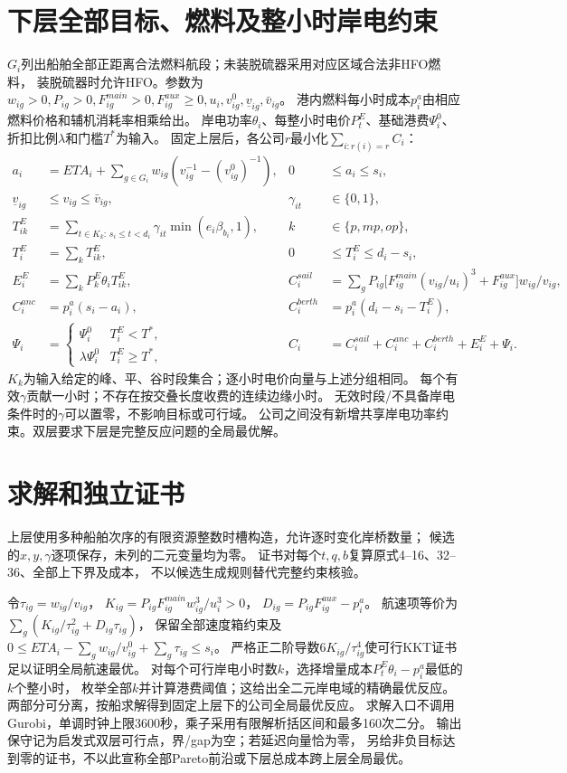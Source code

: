 \documentclass[11pt]{ctexart}
\begin{document}
\section*{下层全部目标、燃料及整小时岸电约束}
$G_i$列出船舶全部正距离合法燃料航段；未装脱硫器采用对应区域合法非HFO燃料，
装脱硫器时允许HFO。参数为$w_{ig}>0,P_{ig}>0,F^{main}_{ig}>0,
F^{aux}_{ig}\ge0,u_i,v^0_{ig},\underline v_{ig},\bar v_{ig}$。
港内燃料每小时成本$p_i^a$由相应燃料价格和辅机消耗率相乘给出。
岸电功率$\theta_i$、每整小时电价$P_t^E$、基础港费$\Psi_i^0$、
折扣比例$\lambda$和门槛$T^*$为输入。
固定上层后，各公司$r$最小化$\sum_{i:r(i)=r}C_i$：
\begin{align*}
a_i&=ETA_i+\sum_{g\in G_i}w_{ig}(v_{ig}^{-1}-(v^0_{ig})^{-1}),&
0&\le a_i\le s_i,\\
\underline v_{ig}&\le v_{ig}\le\bar v_{ig},&
\gamma_{it}&\in\{0,1\},\\
T_{ik}^E&=\sum_{t\in K_k:\,s_i\le t<d_i}
             \gamma_{it}\min(e_i\beta_{b_i},1),&
k&\in\{p,mp,op\},\\
T_i^E&=\sum_kT_{ik}^E,&
0&\le T_i^E\le d_i-s_i,\\
E_i^E&=\sum_k P_k^E\theta_i T_{ik}^E,&
C_i^{sail}&=\sum_gP_{ig}\big[F^{main}_{ig}(v_{ig}/u_i)^3+F^{aux}_{ig}\big]w_{ig}/v_{ig},\\
C_i^{anc}&=p_i^a(s_i-a_i),&
C_i^{berth}&=p_i^a(d_i-s_i-T_i^E),\\
\Psi_i&=\begin{cases}\Psi_i^0&T_i^E<T^*,\\
\lambda\Psi_i^0&T_i^E\ge T^*,\end{cases}&
C_i&=C_i^{sail}+C_i^{anc}+C_i^{berth}+E_i^E+\Psi_i.
\end{align*}
$K_k$为输入给定的峰、平、谷时段集合；逐小时电价向量与上述分组相同。
每个有效$\gamma$贡献一小时；不存在按交叠长度收费的连续边缘小时。
无效时段/不具备岸电条件时的$\gamma$可以置零，不影响目标或可行域。
公司之间没有新增共享岸电功率约束。双层要求下层是完整反应问题的全局最优解。

\section*{求解和独立证书}
上层使用多种船舶次序的有限资源整数时槽构造，允许逐时变化岸桥数量；
候选的$x,y,\gamma$逐项保存，未列的二元变量均为零。
证书对每个$t,q,b$复算原式4--16、32--36、全部上下界及成本，
不以候选生成规则替代完整约束核验。

令$\tau_{ig}=w_{ig}/v_{ig}$，
$K_{ig}=P_{ig}F^{main}_{ig}w_{ig}^3/u_i^3>0$，
$D_{ig}=P_{ig}F^{aux}_{ig}-p_i^a$。
航速项等价为$\sum_g(K_{ig}/\tau_{ig}^2+D_{ig}\tau_{ig})$，
保留全部速度箱约束及$0\le ETA_i-\sum_gw_{ig}/v^0_{ig}+\sum_g\tau_{ig}\le s_i$。
严格正二阶导数$6K_{ig}/\tau_{ig}^4$使可行KKT证书足以证明全局航速最优。
对每个可行岸电小时数$k$，选择增量成本$P_t^E\theta_i-p_i^a$最低的$k$个整小时，
枚举全部$k$并计算港费阈值；这给出全二元岸电域的精确最优反应。
两部分可分离，按船求解得到固定上层下的公司全局最优反应。
求解入口不调用Gurobi，单调时钟上限3600秒，乘子采用有限解析括区间和最多160次二分。
输出保守记为启发式双层可行点，界/gap为空；若延迟向量恰为零，
另给非负目标达到零的证书，不以此宣称全部Pareto前沿或下层总成本跨上层全局最优。
\end{document}
